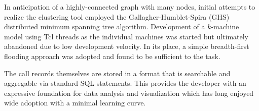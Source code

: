 \documentclass{article}[letter,10pt]
\begin{document}
{{    In anticipation of a highly-connected graph with many nodes, initial attempts
    to realize the clustering tool employed the Gallagher-Humblet-Spira (GHS) distributed
    minimum spanning tree algorithm\autocite[102-106]{DNA}. Development of a $k$-machine
    model\autocite[129-133]{DNA} using Tcl threads as the individual machines was started but ultimately
    abandoned due to low development velocity. In its place, a simple breadth-first
    flooding approach\autocite[55-58]{DNA} was adopted and found to be sufficient to the task.

    The call records themselves are stored in a format that is searchable and aggregable
    via standard SQL statements. This provides the developer with an expressive foundation
    for data analysis and visualization which has long enjoyed wide adoption with a
    minimal learning curve.
  }
}
\end{document}

